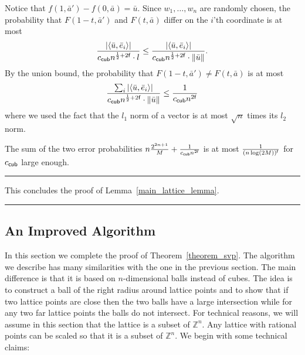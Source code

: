 \documentclass[11pt]{article}
\newcommand{\qedsymb}{\hfill{\rule{2mm}{2mm}}}
\newenvironment{proof}{\begin{trivlist}
\item[\hspace{\labelsep}{\sl\noindent Proof:\/}]
}{\qedsymb\end{trivlist}}
\def\Z{\mathbb{Z}}
\def\half{{\frac{1}{2}}}
\newcommand\C[1]{{ c_{\sf {#1}} }}
\begin{document}
\begin{proof}
\begin{proof}
Notice that $f(1,\bar{a}') - f(0,\bar{a}) = \bar{u}$. Since $w_1,\ldots,w_n$ are randomly chosen, the probability that
$F(1-t, \bar{a}')$ and $F(t,\bar{a})$ differ on the $i$'th coordinate is at most
$$ \frac{|\langle \bar{u}, \bar{e}_i \rangle|}{\C{cub}n^{\half+2{\sf f}}\cdot l} \le
   \frac{|\langle \bar{u}, \bar{e}_i \rangle|}{\C{cub}n^{\half+2{\sf f}}\cdot \|\bar{u}\|}.$$
By the union bound, the probability that $F(1-t, \bar{a}') \neq F(t,\bar{a})$ is at most
$$ \frac{\sum_i |\langle \bar{u}, \bar{e}_i \rangle|}{\C{cub}n^{\half+2{\sf f}}\cdot \|\bar{u}\|} \le
   \frac{1}{\C{cub}n^{2{\sf f}}}$$
where we used the fact that the $l_1$ norm of a vector is at most $\sqrt{n}$ times its $l_2$ norm.

The sum of the two error probabilities $n\frac{2^{2n+1}}{M} + \frac{1}{\C{cub} n^{2{\sf f}}}$ is at most
$\frac{1}{(n\log (2M))^{\sf f}}$ for $\C{cub}$ large enough.
\end{proof}

This concludes the proof of Lemma~\ref{main_lattice_lemma}.
\end{proof}

\subsection{An Improved Algorithm}\label{sec_improved_alg}

In this section we complete the proof of Theorem~\ref{theorem_svp}. The algorithm we describe has many similarities
with the one in the previous section. The main difference is that it is based on $n$-dimensional balls instead of
cubes. The idea is to construct a ball of the right radius around lattice points and to show that if two lattice points
are close then the two balls have a large intersection while for any two far lattice points the balls do not intersect.
For technical reasons, we will assume in this section that the lattice is a subset of $\Z^n$. Any lattice with rational
points can be scaled so that it is a subset of $\Z^n$. We begin with some technical claims:
\end{document}
